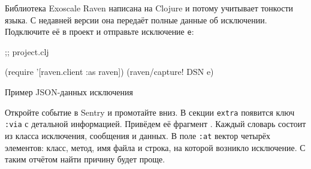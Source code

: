 Библиотека Exoscale Raven написана на Clojure и потому учитывает тонкости
языка. С недавней версии она передаёт полные данные об
исключении. Подключите её в проект и отправьте исключение \verb|e|:

\begin{english}
  \begin{clojure}
 ;; project.clj

(require '[raven.client :as raven])
(raven/capture! DSN e)
  \end{clojure}
\end{english}

\begin{listing}[ht!]

\ifx\devicetype\mobile

\begin{english}
  \begin{json}
  \end{json}
\end{english}

\else

\begin{english}
  \begin{json}
  \end{json}
\end{english}

\fi

  \caption{Пример JSON-данных исключения}
  \label{fig:ex-json-data}
\end{listing}

Откройте событие в Sentry и промотайте вниз. В секции \verb|extra| появится ключ
\verb|:via| с детальной информацией. Привёдем её фрагмент .
Каждый словарь состоит из класса исключения, сообщения и данных. В поле \verb|:at|
вектор четырёх элементов: класс, метод, имя файла и строка, на которой возникло
исключение. С таким отчётом найти причину будет проще.

